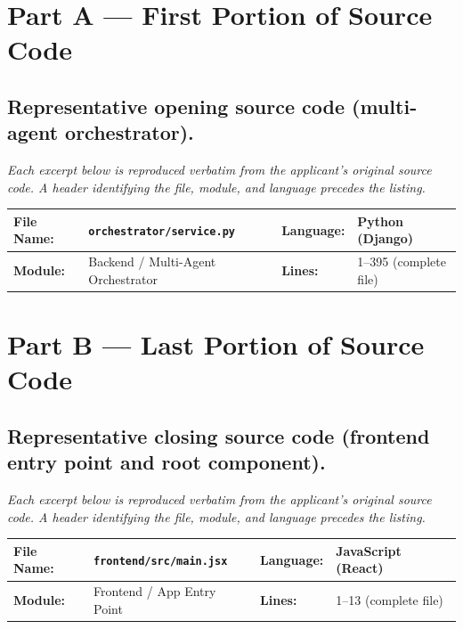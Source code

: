 \documentclass[11pt,a4paper]{article}
\newcommand{\FileHeader}[4]{%
  \begin{center}
  \renewcommand{\arraystretch}{1.3}
  \begin{tabularx}{\linewidth}{|>{\bfseries}l X|>{\bfseries}l X|}
    \hline
    \rowcolor{hdrblue}
    File Name: & #1 & Language: & #2 \\
    \hline
    \rowcolor{hdrblue}
    Module: & #3 & Lines: & #4 \\
    \hline
  \end{tabularx}
  \end{center}
  \vspace{-0.3em}
}
\begin{document}
\newpage

\section*{Part A --- First Portion of Source Code}

\subsection*{Representative opening source code (multi-agent orchestrator).}

\noindent\small\itshape Each excerpt below is reproduced verbatim from the
applicant's original source code. A header identifying the file, module,
and language precedes the listing.\normalfont\normalsize

\vspace{0.6em}

\FileHeader{\nolinkurl{orchestrator/service.py}}{Python (Django)}{Backend / Multi-Agent Orchestrator}{1--395 (complete file)}



\newpage

\section*{Part B --- Last Portion of Source Code}

\subsection*{Representative closing source code (frontend entry point and root component).}

\noindent\small\itshape Each excerpt below is reproduced verbatim from the
applicant's original source code. A header identifying the file, module,
and language precedes the listing.\normalfont\normalsize

\vspace{0.6em}

\FileHeader{\nolinkurl{frontend/src/main.jsx}}{JavaScript (React)}{Frontend / App Entry Point}{1--13 (complete file)}
\end{document}
